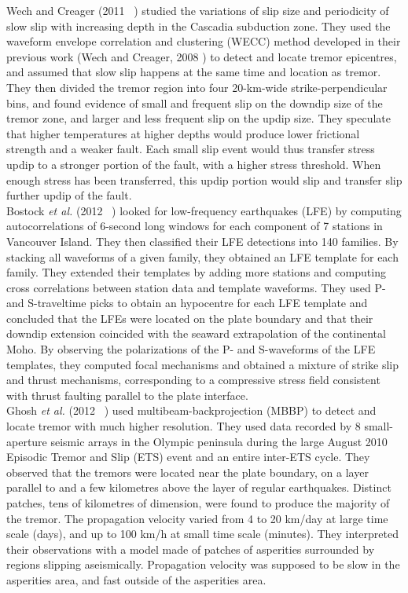 \documentclass[main.tex]{subfiles}
\begin{document}
Wech and Creager (2011~ \cite{WEC_2011}) studied the variations of slip size and periodicity of slow slip with increasing depth in the Cascadia subduction zone. They used the waveform envelope correlation and clustering (WECC) method developed in their previous work (Wech and Creager, 2008 \cite{WEC_2008}) to detect and locate tremor epicentres, and assumed that slow slip happens at the same time and location as tremor. They then divided the tremor region into four 20-km-wide strike-perpendicular bins, and found evidence of small and frequent slip on the downdip size of the tremor zone, and larger and less frequent slip on the updip size. They speculate that higher temperatures at higher depths would produce lower frictional strength and a weaker fault. Each small slip event would thus transfer stress updip to a stronger portion of the fault, with a higher stress threshold. When enough stress has been transferred, this updip portion would slip and transfer slip further updip of the fault. \\

Bostock \textit{et al.} (2012 ~\cite{BOS_2012}) looked for low-frequency earthquakes (LFE) by computing autocorrelations of 6-second long windows for each component of 7 stations in Vancouver Island. They then classified their LFE detections into 140 families. By stacking all waveforms of a given family, they obtained an LFE template for each family. They extended their templates by adding more stations and computing cross correlations between station data and template waveforms. They used P- and S-traveltime picks to obtain an hypocentre for each LFE template and concluded that the LFEs were located on the plate boundary and that their downdip extension coincided with the seaward extrapolation of the continental Moho. By observing the polarizations of the P- and S-waveforms of the LFE templates, they computed focal mechanisms and obtained a mixture of strike slip and thrust mechanisms, corresponding to a compressive stress field consistent with thrust faulting parallel to the plate interface. \\

Ghosh \textit{et al.} (2012 ~\cite{GHO_2012}) used multibeam-backprojection (MBBP) to detect and locate tremor with much higher resolution. They used data recorded by 8 small-aperture seismic arrays in the Olympic peninsula during the large August 2010 Episodic Tremor and Slip (ETS) event and an entire inter-ETS cycle. They observed that the tremors were located near the plate boundary, on a layer parallel to and a few kilometres above the layer of regular earthquakes. Distinct patches, tens of kilometres of dimension, were found to produce the majority of the tremor. The propagation velocity varied from 4 to 20 km/day at large time scale (days), and up to 100 km/h at small time scale (minutes). They interpreted their observations with a model made of patches of asperities surrounded by regions slipping aseismically. Propagation velocity was supposed to be slow in the asperities area, and fast outside of the asperities area. \\
\end{document}
